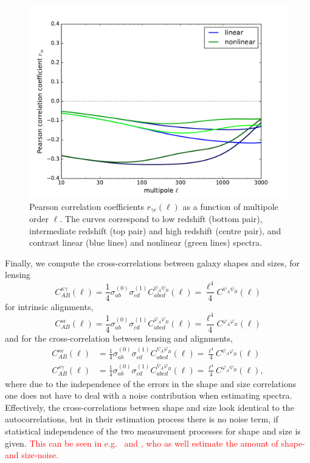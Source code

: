 \documentclass[a4paper,fleqn,usenatbib]{mnras}
\newcommand\BG[1]{\textcolor{red}{#1}}
\begin{document}
\begin{figure}
\centering
\includegraphics[scale=0.45]{./figures/pearson_coefficient.pdf}
\caption{Pearson correlation coefficients $r_{\gamma\epsilon}(\ell)$ as a function of multipole order $\ell$. The curves correspond to low redshift (bottom pair), intermediate redshift (top pair) and high redshift (centre pair), and contrast linear (blue lines) and nonlinear (green lines) spectra.}
\label{fig:pearson}
\end{figure}

Finally, we compute the cross-correlations between galaxy shapes and sizes, for lensing
\begin{equation}
C_{AB}^{\kappa\gamma}(\ell) = \frac{1}{4}\sigma^{(0)}_{ab}\sigma^{(1)}_{cd}C^{\psi_A\psi_B}_{abcd}(\ell) = \frac{\ell^4}{4}C^{\psi_A\psi_B}(\ell)
\end{equation}
for intrinsic alignments,
\begin{equation}
C_{AB}^{s\epsilon}(\ell) = \frac{1}{4}\sigma^{(0)}_{ab}\sigma^{(1)}_{cd}C^{\varphi_A\varphi_B}_{abcd}(\ell) = \frac{\ell^4}{4}C^{\varphi_A\varphi_B}(\ell)
\end{equation}
and for the cross-correlation between lensing and alignments,
\begin{align}
C_{AB}^{\kappa\epsilon}(\ell) & = \frac{1}{4}\sigma^{(0)}_{ab}\sigma^{(1)}_{cd}C^{\psi_A\varphi_B}_{abcd}(\ell) = \frac{\ell^4}{4}C^{\psi_A\varphi_B}(\ell)\\
C_{AB}^{s\gamma}(\ell) & = \frac{1}{4}\sigma^{(0)}_{ab}\sigma^{(1)}_{cd}C^{\psi_A\varphi_B}_{abcd}(\ell) = \frac{\ell^4}{4}C^{\varphi_A\psi_B}(\ell),
\end{align}
where due to the independence of the errors in the shape and size correlations one does not have to deal with a noise contribution when estimating spectra. Effectively, the cross-correlations between shape and size look identical to the autocorrelations, but in their estimation process there is no noise term, if statistical independence of the two measurement processes for shape and size is given. \BG{This can be seen in e.g.~\cite{heavens_combining_2013} and \cite{alsing_weak_2014}, who as well estimate the amount of shape- and size-noise.}
\end{document}
